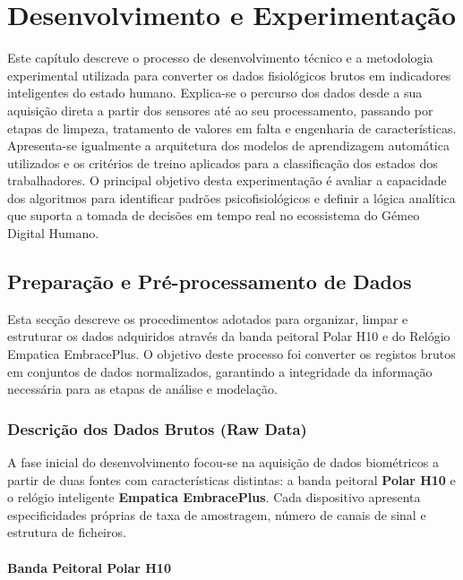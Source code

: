 
\chapter{Desenvolvimento e Experimentação}
\label{chap:Chapter4} %

Este capítulo descreve o processo de desenvolvimento técnico e a metodologia experimental utilizada para converter os dados fisiológicos brutos em indicadores inteligentes do estado humano. Explica-se o percurso dos dados desde a sua aquisição direta a partir dos sensores até ao seu processamento, passando por etapas de limpeza, tratamento de valores em falta e engenharia de características. Apresenta-se igualmente a arquitetura dos modelos de aprendizagem automática utilizados e os critérios de treino aplicados para a classificação dos estados dos trabalhadores. O principal objetivo desta experimentação é avaliar a capacidade dos algoritmos para identificar padrões psicofisiológicos e definir a lógica analítica que suporta a tomada de decisões em tempo real no ecossistema do Gémeo Digital Humano.

\section{Preparação e Pré-processamento de Dados}

Esta secção descreve os procedimentos adotados para organizar, limpar e estruturar os dados adquiridos através da banda peitoral Polar H10 e do Relógio Empatica EmbracePlus. O objetivo deste processo foi converter os registos brutos em conjuntos de dados normalizados, garantindo a integridade da informação necessária para as etapas de análise e modelação.

\subsection{Descrição dos Dados Brutos (Raw Data)}

A fase inicial do desenvolvimento focou-se na aquisição de dados biométricos a partir de duas fontes com características distintas: a banda peitoral \textbf{Polar H10} e o relógio inteligente \textbf{Empatica EmbracePlus}. Cada dispositivo apresenta especificidades próprias de taxa de amostragem, número de canais de sinal e estrutura de ficheiros.

\subsubsection*{Banda Peitoral Polar H10}

